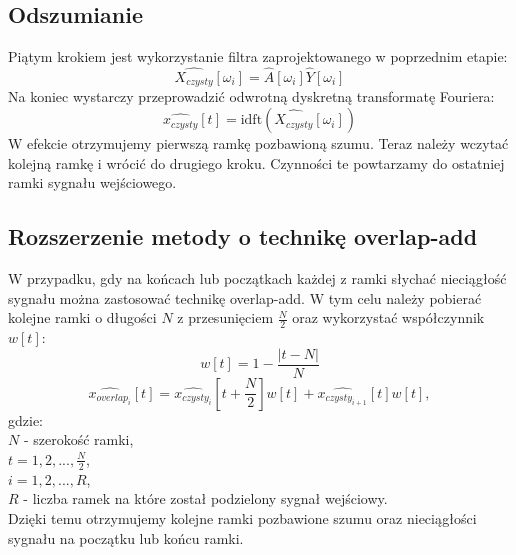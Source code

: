 \documentclass[11pt,a4paper,twoside]{article}
\begin{document}
\subsection{Odszumianie}
Piątym krokiem jest wykorzystanie filtra zaprojektowanego w poprzednim etapie: 
\begin{equation}
	\widehat{X_{czysty}}[\omega_{i}] = \widehat{A}[\omega_{i}]\widehat{Y}[\omega_{i}]
\end{equation}
Na koniec wystarczy przeprowadzić odwrotną dyskretną transformatę Fouriera:
\begin{equation}
	\widehat{x_{czysty}}[t] =\mathrm{idft}(\widehat{X_{czysty}}[\omega_{i}]) 
\end{equation}
W efekcie otrzymujemy pierwszą ramkę pozbawioną szumu. Teraz należy wczytać kolejną ramkę i wrócić do drugiego kroku. Czynności te powtarzamy do ostatniej ramki sygnału wejściowego. 

\subsection{Rozszerzenie metody o technikę overlap-add}
W przypadku, gdy na końcach lub początkach każdej z ramki słychać nieciągłość sygnału można zastosować technikę overlap-add. W tym celu należy pobierać kolejne ramki o długości $N$ z przesunięciem $\frac{N}{2}$ oraz wykorzystać współczynnik $w[t]$:
\begin{equation}
	w[t] = 1 - \frac{|t-N|}{N}
\end{equation}
\begin{equation}
	\widehat{x_{overlap_{i}}}[t]=\widehat{x_{czysty_i}}[t+\frac{N}{2}]w[t] + \widehat{x_{czysty_{i+1}}}[t]w[t],
\end{equation} gdzie: \\
$N$ - szerokość ramki,\\ 
$t = 1,2,...,\frac{N}{2}$, \\
$i = 1,2,...,R$, \\
$R$ - liczba ramek na które został podzielony sygnał wejściowy. \\

Dzięki temu otrzymujemy kolejne ramki pozbawione szumu oraz nieciągłości sygnału na początku lub końcu ramki.
\end{document}
